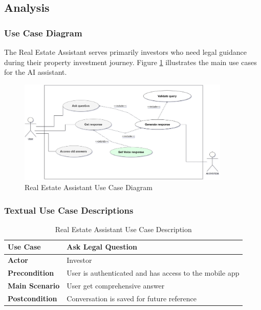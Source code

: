 \subsection{Analysis}
\subsubsection{Use Case Diagram}
The Real Estate Assistant serves primarily investors who need legal guidance during their property investment journey. Figure \ref{fig:assistant-use-case} illustrates the main use cases for the AI assistant.
\begin{figure}[htbp]
    \centering
    \includegraphics[width=0.9\textwidth]{images/assistant_use_case_diagram.png}
    \caption{Real Estate Assistant Use Case Diagram}
    \label{fig:assistant-use-case}
\end{figure}

\subsubsection{Textual Use Case Descriptions}

\begin{table}[htbp]
    \centering
    \begin{tabular}{|p{3cm}|p{10cm}|}
        \hline
        \textbf{Use Case} & \textbf{Ask Legal Question} \\
        \hline
        \textbf{Actor} & Investor \\
        \hline
        \textbf{Precondition} & User is authenticated and has access to the mobile app \\
        \hline
        \textbf{Main Scenario} & User get comprehensive answer \\
        \hline
        \textbf{Postcondition} & Conversation is saved for future reference \\
        \hline
    \end{tabular}
    \caption{Real Estate Assistant Use Case Description}
    \label{tab:assistant-use-case}
\end{table}

